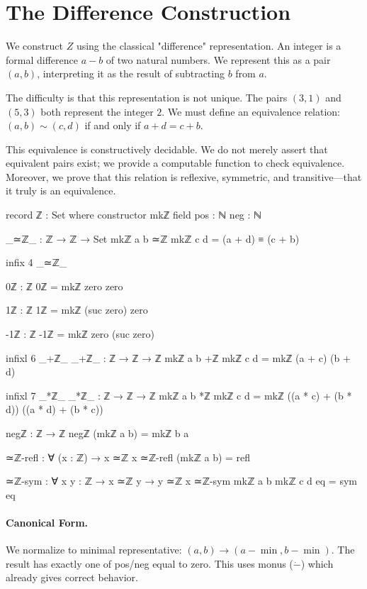 \documentclass[11pt,a4paper]{book}
\def\mathbb#1{#1}%
\begin{document}
\section{The Difference Construction}

We construct $\mathbb{Z}$ using the classical "difference" representation. An integer 
is a formal difference $a - b$ of two natural numbers. We represent this as a pair $(a, b)$, 
interpreting it as the result of subtracting $b$ from $a$.

The difficulty is that this representation is not unique. The pairs $(3,1)$ and $(5,3)$ 
both represent the integer $2$. We must define an equivalence relation: $(a,b) \sim (c,d)$ 
if and only if $a + d = c + b$.

This equivalence is constructively decidable. We do not merely assert that equivalent 
pairs exist; we provide a computable function to check equivalence. Moreover, we prove 
that this relation is reflexive, symmetric, and transitive—that it truly is an equivalence.

\begin{code}
record ℤ : Set where
  constructor mkℤ
  field
    pos : ℕ
    neg : ℕ

_≃ℤ_ : ℤ → ℤ → Set
mkℤ a b ≃ℤ mkℤ c d = (a + d) ≡ (c + b)

infix 4 _≃ℤ_

0ℤ : ℤ
0ℤ = mkℤ zero zero

1ℤ : ℤ
1ℤ = mkℤ (suc zero) zero

-1ℤ : ℤ
-1ℤ = mkℤ zero (suc zero)

infixl 6 _+ℤ_
_+ℤ_ : ℤ → ℤ → ℤ
mkℤ a b +ℤ mkℤ c d = mkℤ (a + c) (b + d)

infixl 7 _*ℤ_
_*ℤ_ : ℤ → ℤ → ℤ
mkℤ a b *ℤ mkℤ c d = mkℤ ((a * c) + (b * d)) ((a * d) + (b * c))

negℤ : ℤ → ℤ
negℤ (mkℤ a b) = mkℤ b a

≃ℤ-refl : ∀ (x : ℤ) → x ≃ℤ x
≃ℤ-refl (mkℤ a b) = refl

≃ℤ-sym : ∀ {x y : ℤ} → x ≃ℤ y → y ≃ℤ x
≃ℤ-sym {mkℤ a b} {mkℤ c d} eq = sym eq
\end{code}

\paragraph{Canonical Form.}
We normalize to minimal representative: $(a,b) \to (a-\min, b-\min)$.
The result has exactly one of pos/neg equal to zero. This uses monus ($\dot{-}$)
which already gives correct behavior.
\end{document}
